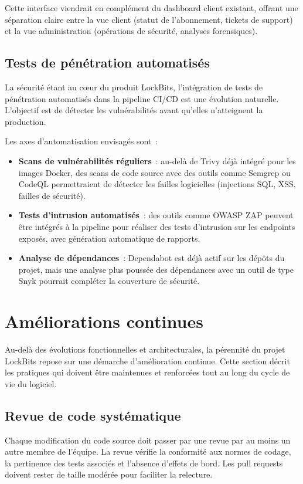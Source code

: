 Cette interface viendrait en complément du dashboard client existant,
offrant une séparation claire entre la vue client (statut de
l'abonnement, tickets de support) et la vue administration (opérations
de sécurité, analyses forensiques).

\subsection{Tests de pénétration automatisés}

La sécurité étant au cœur du produit LockBits, l'intégration de tests
de pénétration automatisés dans la pipeline CI/CD est une évolution
naturelle. L'objectif est de détecter les vulnérabilités avant qu'elles
n'atteignent la production.

Les axes d'automatisation envisagés sont~:

\begin{itemize}
  \item \textbf{Scans de vulnérabilités réguliers}~: au-delà de Trivy
    déjà intégré pour les images Docker, des scans de code source avec
    des outils comme Semgrep ou CodeQL permettraient de détecter les
    failles logicielles (injections SQL, XSS, failles de sécurité).
  \item \textbf{Tests d'intrusion automatisés}~: des outils comme OWASP
    ZAP peuvent être intégrés à la pipeline pour réaliser des tests
    d'intrusion sur les endpoints exposés, avec génération automatique
    de rapports.
  \item \textbf{Analyse de dépendances}~: Dependabot est déjà actif sur
    les dépôts du projet, mais une analyse plus poussée des
    dépendances avec un outil de type Snyk pourrait compléter la
    couverture de sécurité.
\end{itemize}

\section{Améliorations continues}

Au-delà des évolutions fonctionnelles et architecturales, la pérennité
du projet LockBits repose sur une démarche d'amélioration continue.
Cette section décrit les pratiques qui doivent être maintenues et
renforcées tout au long du cycle de vie du logiciel.


\subsection{Revue de code systématique}
Chaque modification du code source
doit passer par une revue par au moins un autre membre de l'équipe. La
revue vérifie la conformité aux normes de codage, la pertinence des
tests associés et l'absence d'effets de bord. Les pull requests doivent
rester de taille modérée pour faciliter la relecture.

